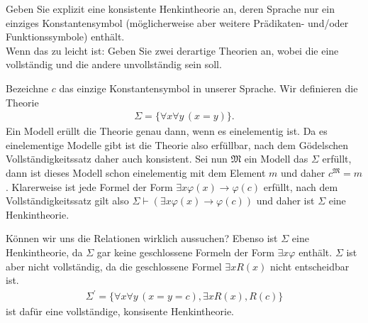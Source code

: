 
\begin{exercise}[138]

Geben Sie explizit eine konsistente Henkintheorie an, deren Sprache nur ein
einziges Konstantensymbol (möglicherweise aber weitere Prädikaten- und/oder
Funktionssymbole) enthält. \\
Wenn das zu leicht ist: Geben Sie zwei derartige Theorien an, wobei die eine
vollständig und die andere unvollständig sein soll.

\end{exercise}


\begin{solution}
Bezeichne $c$ das einzige Konstantensymbol in unserer Sprache. Wir definieren die Theorie
\begin{align*}
  \Sigma = \{\forall x \forall y\, (x = y)\}.
\end{align*}
Ein Modell erüllt die Theorie genau dann, wenn es einelementig ist. Da es einelementige Modelle gibt ist die Theorie also erfüllbar, nach dem Gödelschen Vollständigkeitssatz daher auch konsistent. Sei nun $\mathfrak{M}$ ein Modell das $\Sigma$ erfüllt, dann ist dieses Modell schon einelementig mit dem Element $m$ und daher $c^{\mathfrak{M}} = m$. Klarerweise ist jede Formel der Form $\exists x \varphi(x) \rightarrow \varphi(c)$ erfüllt, nach dem Vollständigkeitssatz gilt also $\Sigma \vdash (\exists x \varphi(x) \rightarrow \varphi(c))$ und daher ist $\Sigma$ eine Henkintheorie.


Können wir uns die Relationen wirklich aussuchen?
Ebenso ist $\Sigma$ eine Henkintheorie, da $\Sigma$ gar keine geschlossene
Formeln der Form $\exists x \varphi$ enthält. $\Sigma$ ist aber nicht vollständig,
da die geschlossene Formel $\exists x R(x)$ nicht entscheidbar ist.
\begin{align*}
  \Sigma^{\prime} = \{\forall x \forall y\, (x = y = c), \exists x R(x), R(c)\}
\end{align*}
ist dafür eine vollständige, konsisente Henkintheorie.
\end{solution}

